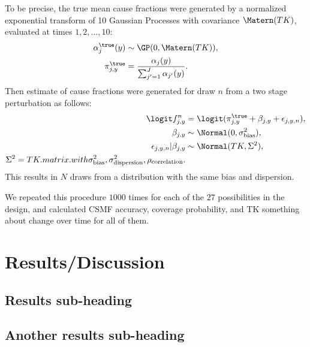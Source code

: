   To be precise, the true mean cause fractions were generated by a
  normalized exponential transform of 10 Gaussian Processes with
  covariance $\Matern(TK)$, evaluated at times $1,2,\ldots,10$:
  \begin{align*}
  \alpha^{\true}_j(y) &\sim \GP(0, \Matern(TK)),\\
  \pi^{\true}_{j,y} &= \frac{\alpha_j(y)}{\sum_{j'=1}^J \alpha_{j'}(y)}.
  \end{align*}
  Then estimate of cause fractions were generated for draw $n$ from a two stage perturbation as follows:
  \begin{align*}
  \logit f^n_{j,y} &= \logit(\pi^{\true}_{j,y} + \beta_{j,y} + \epsilon_{j,y,n}),\\
  \beta_{j,y} &\sim \Normal(0, \sigma_\text{bias}^2),\\
  \epsilon_{j,y,n}|\beta_{j,y} &\sim \Normal(TK, \Sigma^2),\\
  \Sigma^2 = TK.matrix.with \sigma_\text{bias}^2, \sigma_\text{dispersion}^2, \rho_\text{correlation}.
  \end{align*}
  This results in $N$ draws from a distribution with the same bias and dispersion.

  We repeated this procedure $1000$ times for each of the $27$
  possibilities in the design, and calculated CSMF accuracy, coverage
  probability, and TK something about change over time for all of
  them.


\section*{Results/Discussion}
  \subsection*{Results sub-heading}

  \subsection*{Another results sub-heading}


